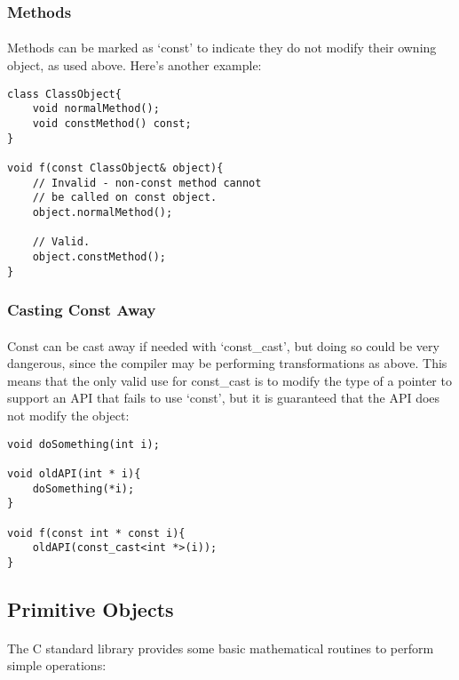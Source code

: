 \documentclass[12pt,twoside,notitlepage]{report}
\begin{document}
\subsubsection{Methods}

\paragraph{}
Methods can be marked as `const' to indicate they do not modify their owning object, as used above. Here's another example:

\begin{lstlisting}
class ClassObject{
	void normalMethod();
	void constMethod() const;
}

void f(const ClassObject& object){
	// Invalid - non-const method cannot
	// be called on const object.
	object.normalMethod();
	
	// Valid.
	object.constMethod();
}
\end{lstlisting}

\subsubsection{Casting Const Away}

\paragraph{}
Const can be cast away if needed with `const\_cast', but doing so could be very dangerous, since the compiler may be performing transformations as above. This means that the only valid use for const\_cast is to modify the type of a pointer to support an API that fails to use `const', but it is guaranteed that the API does not modify the object:

\begin{lstlisting}
void doSomething(int i);

void oldAPI(int * i){
	doSomething(*i);
}

void f(const int * const i){
	oldAPI(const_cast<int *>(i));
}
\end{lstlisting}

\clearpage

\subsection{Primitive Objects}

\paragraph{}
The C standard library provides some basic mathematical routines to perform simple operations:
\end{document}
